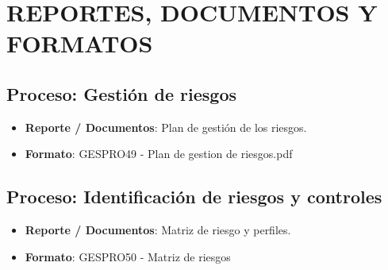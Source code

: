 \chapter{REPORTES, DOCUMENTOS Y FORMATOS}
%
\section{Proceso: Gesti\'on de riesgos}
%
\begin{itemize}
	\item \textbf{Reporte / Documentos}: Plan de gesti\'on de los riesgos.
	\item \textbf{Formato}: GESPRO49 - Plan de gestion de riesgos.pdf
\end{itemize}
%
%
\section{Proceso: Identificaci\'on de riesgos y controles}
%
\begin{itemize}
	\item \textbf{Reporte / Documentos}: Matriz de riesgo y perfiles.
	\item \textbf{Formato}: GESPRO50 - Matriz de riesgos
\end{itemize}